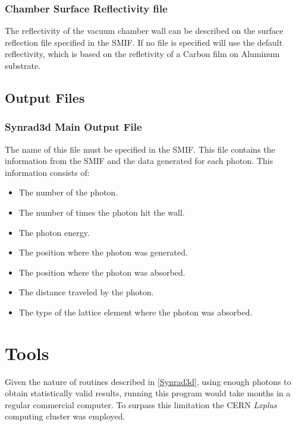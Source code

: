 \subsubsection*{Chamber Surface Reflectivity file}
The reflectivity of the vacuum chamber wall can be described on the surface reflection file specified in the SMIF. If no file is specified \srthree will use the default reflectivity, which  is based on the refletivity of a Carbon film on Aluminum substrate. 

\subsection{Output Files}

\subsubsection*{Synrad3d Main Output File}
The name of this file must be specified in the SMIF. This file contains the information from the SMIF and the data generated for each photon. This information consists of:
\begin{itemize}
\item The number of the photon.
\item The number of times the photon hit the wall.
\item The photon energy.
\item The position where the photon was generated.
\item The position where the photon was absorbed.
\item The distance traveled by the photon.
\item The type of the lattice element where the photon was absorbed.
\end{itemize}




\section{Tools}
Given the nature of routines described in \ref{Synrad3d}, using enough photons to obtain statistically valid results, running this program would take months in a regular commercial computer. To surpass this limitation the CERN {\it Lxplus} computing cluster was employed.
